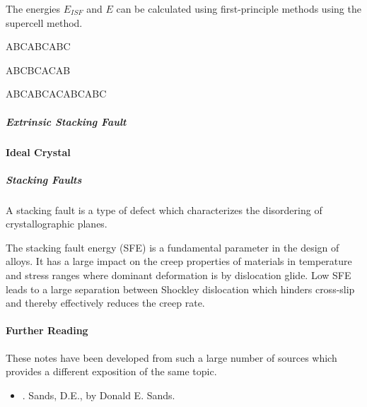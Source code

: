 \documentclass[letterpaper,10pt,english]{sphinxmanual}
\begin{document}
The energies \(E_{ISF}\) and \(E\) can be calculated using first-principle methods using the supercell method.

ABCABCABC

ABC\textbar{}BCA\textbar{}CAB\textbar{}

ABCABCA\textbar{}CABCABC


\subparagraph{Extrinsic Stacking Fault}
\label{\detokenize{crystallography/fcc_sf:extrinsic-stacking-fault}}



\paragraph{Ideal Crystal}
\label{\detokenize{crystallography/index:ideal-crystal}}
{\hyperref[\detokenize{crystallography/perfect_crystal:perfect-crystal}]{}}


\subparagraph{Stacking Faults}
\label{\detokenize{crystallography/index:stacking-faults}}
A stacking fault is a type of defect which characterizes the disordering of crystallographic planes.

The stacking fault energy (SFE) is a fundamental parameter in the design of alloys.
It has a large impact on the creep properties of materials in temperature and stress ranges where dominant deformation is by dislocation glide.  Low SFE leads to a large separation between Shockley dislocation which hinders cross-slip and thereby effectively reduces the creep rate.



\paragraph{Further Reading}
\label{\detokenize{crystallography/index:further-reading}}
These notes have been developed from such a large number of sources which provides a different exposition of the same topic.
\begin{itemize}
\item {} 
\label{\detokenize{crystallography/index:id1}}{\hyperref[\detokenize{crystallography/index:id3}]{\sphinxcrossref{{[}San69{]}}}}.  Sands, D.E.,  by Donald E. Sands. \label{\detokenize{crystallography/index:id2}}{\hyperref[\detokenize{crystallography/index:id3}]{\sphinxcrossref{{[}San69{]}}}}

\end{itemize}
\end{document}
